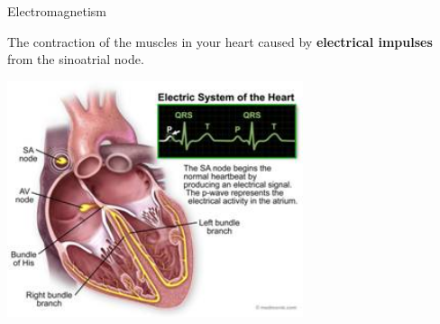 \begin{frame}{Electromagnetism}

The contraction of the muscles in your heart caused by
{\bf electrical impulses} from the sinoatrial node.

\begin{center}
   \includegraphics[width=0.65\textwidth]{./images/misc/electrical_system_heart.jpg}\\
\end{center}

\end{frame}

%
%
%

